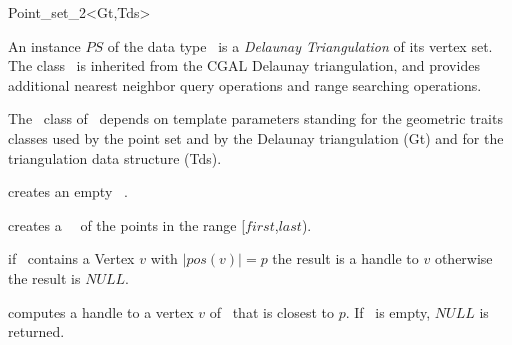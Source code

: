 \begin{ccRefClass}{Point_set_2<Gt,Tds>}

\ccDefinition


An instance $PS$ of the data type \ccRefName\  is a {\em Delaunay Triangulation}
of its vertex set. The class \ccRefName\ is inherited from the CGAL Delaunay triangulation,
and provides additional nearest neighbor query operations and range searching operations.

The \ccRefName\ class of \cgal\ depends on template parameters standing for the
geometric traits classes used by the point set and by the Delaunay triangulation (Gt)
and for the triangulation data structure (Tds). 




\ccHtmlLinksOff


\ccTypes
{}
\ccThreeToTwo
{}

\ccHtmlLinksOn


\ccCreation

{creates an empty \ccRefName\ .}


{creates a \ccRefName\ \ccVar\ of the points in the range
[$first$,$last$).}


\ccOperations


\ccHtmlLinksOff


{ if \ccVar\ contains a Vertex $v$ with $|pos(v)| = p$ 
the result is a handle to $v$ otherwise the result is $NULL$. }


{ computes a handle to a vertex $v$ of \ccVar\ that is closest to $p$.
If \ccVar\ is empty, $NULL$ is returned.
}


\end{ccRefClass}
